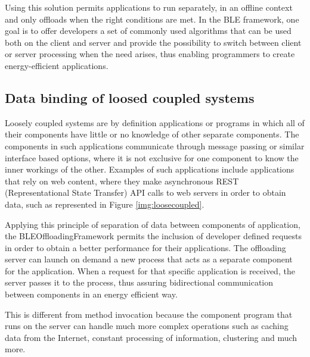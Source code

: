 	Using this solution permits applications to run separately, in an offline context and only offloads when the right conditions are met. In the BLE framework, one goal is to offer developers a set of commonly used algorithms that can be used both on the client and server and provide the possibility to switch between client or server processing when the need arises, thus enabling programmers to create energy-efficient applications.
	

\subsection{Data binding of loosed coupled systems}

	Loosely coupled systems are by definition applications or programs in which all of their components have little or no knowledge of other separate components. The components in such applications communicate through message passing or similar interface based options, where it is not exclusive for one component to know the inner workings of the other. Examples of such applications include applications that rely on web content, where they make asynchronous REST (Representational State Transfer) API calls to web servers in order to obtain data, such as represented in Figure \ref{img:loosecoupled}.
	
	

Applying this principle of separation of data between components of application, the BLEOffloadingFramework permits the inclusion of developer defined requests in order to obtain a better performance for their applications. The offloading server can launch on demand a new process that acts as a separate component for the application. When a request for that specific application is received, the server passes it to the process, thus assuring bidirectional communication between components in an energy efficient way.

This is different from method invocation because the component program that runs on the server can handle much more complex operations such as caching data from the Internet, constant processing of information, clustering and much more.


